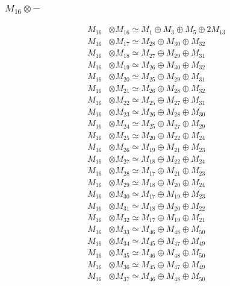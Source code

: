 \subsubsection{$ M_{16}\otimes -$}
\begin{align*}
M_{16} &\otimes M_{16} \simeq M_{1} \oplus M_{3} \oplus M_{5} \oplus 2M_{13} \\
M_{16} &\otimes M_{17} \simeq M_{28} \oplus M_{30} \oplus M_{32} \\
M_{16} &\otimes M_{18} \simeq M_{27} \oplus M_{29} \oplus M_{31} \\
M_{16} &\otimes M_{19} \simeq M_{26} \oplus M_{30} \oplus M_{32} \\
M_{16} &\otimes M_{20} \simeq M_{25} \oplus M_{29} \oplus M_{31} \\
M_{16} &\otimes M_{21} \simeq M_{26} \oplus M_{28} \oplus M_{32} \\
M_{16} &\otimes M_{22} \simeq M_{25} \oplus M_{27} \oplus M_{31} \\
M_{16} &\otimes M_{23} \simeq M_{26} \oplus M_{28} \oplus M_{30} \\
M_{16} &\otimes M_{24} \simeq M_{25} \oplus M_{27} \oplus M_{29} \\
M_{16} &\otimes M_{25} \simeq M_{20} \oplus M_{22} \oplus M_{24} \\
M_{16} &\otimes M_{26} \simeq M_{19} \oplus M_{21} \oplus M_{23} \\
M_{16} &\otimes M_{27} \simeq M_{18} \oplus M_{22} \oplus M_{24} \\
M_{16} &\otimes M_{28} \simeq M_{17} \oplus M_{21} \oplus M_{23} \\
M_{16} &\otimes M_{29} \simeq M_{18} \oplus M_{20} \oplus M_{24} \\
M_{16} &\otimes M_{30} \simeq M_{17} \oplus M_{19} \oplus M_{23} \\
M_{16} &\otimes M_{31} \simeq M_{18} \oplus M_{20} \oplus M_{22} \\
M_{16} &\otimes M_{32} \simeq M_{17} \oplus M_{19} \oplus M_{21} \\
M_{16} &\otimes M_{33} \simeq M_{46} \oplus M_{48} \oplus M_{50} \\
M_{16} &\otimes M_{34} \simeq M_{45} \oplus M_{47} \oplus M_{49} \\
M_{16} &\otimes M_{35} \simeq M_{46} \oplus M_{48} \oplus M_{50} \\
M_{16} &\otimes M_{36} \simeq M_{45} \oplus M_{47} \oplus M_{49} \\
M_{16} &\otimes M_{37} \simeq M_{46} \oplus M_{48} \oplus M_{50} \\

\end{align*}
